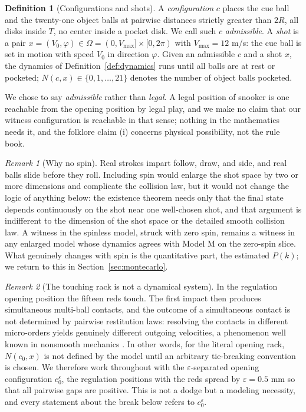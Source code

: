 \documentclass[11pt]{article}
\theoremstyle{definition}
\newtheorem{definition}{Definition}
\theoremstyle{remark}
\newtheorem{remark}{Remark}
\newcommand{\OO}{\Omega}
\begin{document}
\begin{definition}[Configurations and shots]
A \emph{configuration} $c$ places the cue ball and the twenty-one
object balls at pairwise distances strictly greater than $2R$, all
disks inside $T$, no center inside a pocket disk. We call such $c$
\emph{admissible}. A \emph{shot} is a pair
$x = (V_0, \varphi) \in \OO = (0, V_{\max}] \times [0, 2\pi)$ with
$V_{\max} = 12$ m/s: the cue ball is set in motion with speed $V_0$
in direction $\varphi$. Given an admissible $c$ and a shot $x$, the
dynamics of Definition~\ref{def:dynamics} runs until all balls are at
rest or pocketed; $N(c, x) \in \{0, 1, \dots, 21\}$ denotes the
number of object balls pocketed.
\end{definition}

We chose to say \emph{admissible} rather than \emph{legal}. A legal
position of snooker is one reachable from the opening position by
legal play, and we make no claim that our witness configuration is
reachable in that sense; nothing in the mathematics needs it, and the
folklore claim (i) concerns physical possibility, not the rule book.

\begin{remark}[Why no spin]
\label{rem:spin}
Real strokes impart follow, draw, and side, and real balls slide
before they roll. Including spin would enlarge the shot space by two
or more dimensions and complicate the collision law, but it would
not change the logic of anything below: the existence theorem needs
only that the final state depends continuously on the shot near one
well-chosen shot, and that argument is indifferent to the dimension
of the shot space or the detailed smooth collision law. A witness in
the spinless model, struck with zero spin, remains a witness in any
enlarged model whose dynamics agrees with Model M on the zero-spin
slice. What genuinely changes with spin is the quantitative part,
the estimated $P(k)$; we return to this in
Section~\ref{sec:montecarlo}.
\end{remark}

\begin{remark}[The touching rack is not a dynamical system]
\label{rem:touching}
In the regulation opening position the fifteen reds touch. The first
impact then produces simultaneous multi-ball contacts, and the
outcome of a simultaneous contact is not determined by pairwise
restitution laws: resolving the contacts in different micro-orders
yields genuinely different outgoing velocities, a phenomenon
well known in nonsmooth mechanics \cite{ballard2000}. In other
words, for the literal opening rack, $N(c_0, x)$ is not defined by
the model until an arbitrary tie-breaking convention is chosen. We
therefore work throughout with the $\varepsilon$-separated opening
configuration $c_0^{\varepsilon}$, the regulation positions with the
reds spread by $\varepsilon = 0.5$ mm so that all pairwise gaps are
positive. This is not a dodge but a modeling necessity, and every
statement about the break below refers to $c_0^{\varepsilon}$.
\end{remark}
\end{document}
